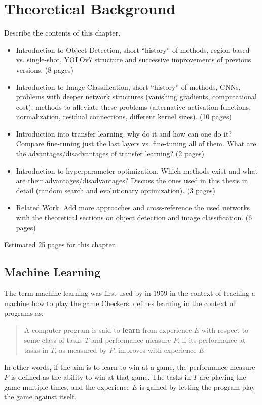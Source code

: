 \documentclass[draft,final]{vutinfth} %
\begin{document}
\chapter{Theoretical Background}
\label{chap:background}

Describe the contents of this chapter.

\begin{itemize}
\item Introduction to Object Detection, short ``history'' of methods,
  region-based vs. single-shot, YOLOv7 structure and successive
  improvements of previous versions. (8 pages)
\item Introduction to Image Classification, short ``history'' of
  methods, CNNs, problems with deeper network structures (vanishing
  gradients, computational cost), methods to alleviate these problems
  (alternative activation functions, normalization, residual
  connections, different kernel sizes). (10 pages)
\item Introduction into transfer learning, why do it and how can one
  do it? Compare fine-tuning just the last layers vs. fine-tuning all
  of them. What are the advantages/disadvantages of transfer learning?
  (2 pages)
\item Introduction to hyperparameter optimization. Which methods exist
  and what are their advantages/disadvantages? Discuss the ones used
  in this thesis in detail (random search and evolutionary
  optimization). (3 pages)
\item Related Work. Add more approaches and cross-reference the used
  networks with the theoretical sections on object detection and image
  classification. (6 pages)
\end{itemize}

Estimated 25 pages for this chapter.

\section{Machine Learning}
\label{sec:theory-ml}

The term machine learning was first used by \textcite{samuel1959} in
1959 in the context of teaching a machine how to play the game
Checkers. \textcite{mitchell1997a} defines learning in the context of
programs as:
\begin{quote}
  A computer program is said to \textbf{learn} from experience $E$
  with respect to some class of tasks $T$ and performance measure $P$,
  if its performance at tasks in $T$, as measured by $P$, improves
  with experience $E$. \cite[p.2]{mitchell1997a}
\end{quote}
In other words, if the aim is to learn to win at a game, the
performance measure $P$ is defined as the ability to win at that
game. The tasks in $T$ are playing the game multiple times, and the
experience $E$ is gained by letting the program play the game against
itself.
\end{document}
